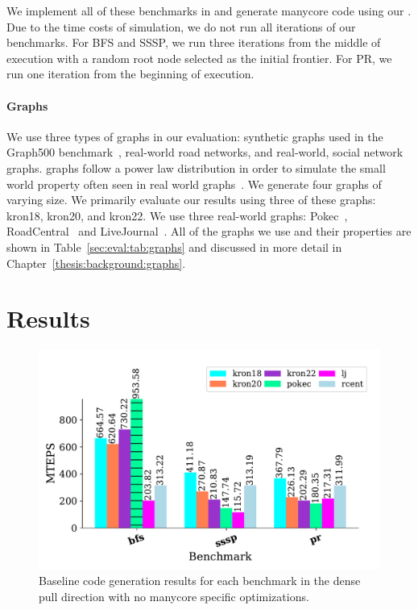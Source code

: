 We implement all of these benchmarks in \graphit and generate manycore code using our \hb \graphvm.
Due to the time costs of simulation, we do not run all iterations of our benchmarks. 
For BFS and SSSP, we run three iterations from the middle of execution with a random root node selected as the initial frontier.
For PR, we run one iteration from the beginning of execution.



\paragraph{Graphs} We use three types of graphs in our evaluation: synthetic \kron graphs used in the Graph500 benchmark~\cite{murphy2010graph500}, real-world road networks, and real-world, social network graphs.
\kron graphs follow a power law distribution in order to simulate the small world property often seen in real world graphs~\cite{leskovec2010kronecker}.
We generate four \kron graphs of varying size. 
We primarily evaluate our results using three of these graphs: kron18, kron20, and kron22.
We use three real-world graphs: Pokec~\cite{pokec}, RoadCentral~\cite{davis2011university} and LiveJournal~\cite{lj}.
All of the graphs we use and their properties are shown in Table~\ref{sec:eval:tab:graphs} and discussed in more detail in Chapter~\ref{thesis:background:graphs}.


\section{Results}
\begin{figure}[!ht]
    \centering
    \includegraphics[scale = 0.6]{graphit-figures/baseline.pdf}
    \caption{Baseline code generation results for each benchmark in the dense pull direction with no manycore specific optimizations.}
    \label{pap:generals:sec:eval:fig:baseline}
\end{figure}

